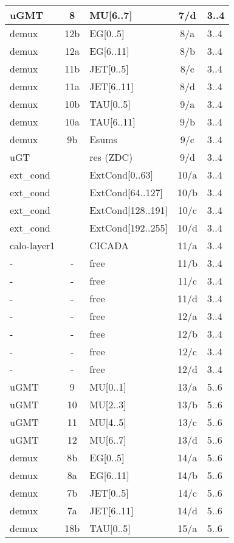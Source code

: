 \begin{longtable}{|l|c|l|c|l|}
uGMT  & 8   & MU[6..7]   & 7/d  & 3..4 \\\hline
demux & 12b & EG[0..5]   & 8/a  & 3..4 \\\hline
demux & 12a & EG[6..11]  & 8/b  & 3..4 \\\hline
demux & 11b & JET[0..5]  & 8/c  & 3..4 \\\hline
demux & 11a & JET[6..11] & 8/d  & 3..4 \\\hline
demux & 10b & TAU[0..5]  & 9/a  & 3..4 \\\hline
demux & 10a & TAU[6..11] & 9/b  & 3..4 \\\hline
demux & 9b  & Esums      & 9/c  & 3..4 \\\hline
uGT   &     & res (ZDC)  & 9/d  & 3..4 \\\hline
ext\_cond &     & ExtCond[0..63]    & 10/a & 3..4 \\\hline
ext\_cond &     & ExtCond[64..127]  & 10/b & 3..4 \\\hline
ext\_cond &     & ExtCond[128..191] & 10/c & 3..4 \\\hline
ext\_cond &     & ExtCond[192..255] & 10/d & 3..4 \\\hline
calo-layer1 &   & CICADA & 11/a & 3..4 \\\hline
- & - & free & 11/b & 3..4 \\\hline
- & - & free & 11/c & 3..4 \\\hline
- & - & free & 11/d & 3..4 \\\hline
- & - & free & 12/a & 3..4 \\\hline
- & - & free & 12/b & 3..4 \\\hline
- & - & free & 12/c & 3..4 \\\hline
- & - & free & 12/d & 3..4 \\\hline
\hline
uGMT  & 9   & MU[0..1]   & 13/a & 5..6 \\\hline
uGMT  & 10  & MU[2..3]   & 13/b & 5..6 \\\hline
uGMT  & 11  & MU[4..5]   & 13/c & 5..6 \\\hline
uGMT  & 12  & MU[6..7]   & 13/d & 5..6 \\\hline
demux & 8b  & EG[0..5]   & 14/a & 5..6 \\\hline
demux & 8a  & EG[6..11]  & 14/b & 5..6 \\\hline
demux & 7b  & JET[0..5]  & 14/c & 5..6 \\\hline
demux & 7a  & JET[6..11] & 14/d & 5..6 \\\hline
demux & 18b & TAU[0..5]  & 15/a & 5..6 \\\hline

\end{longtable}
